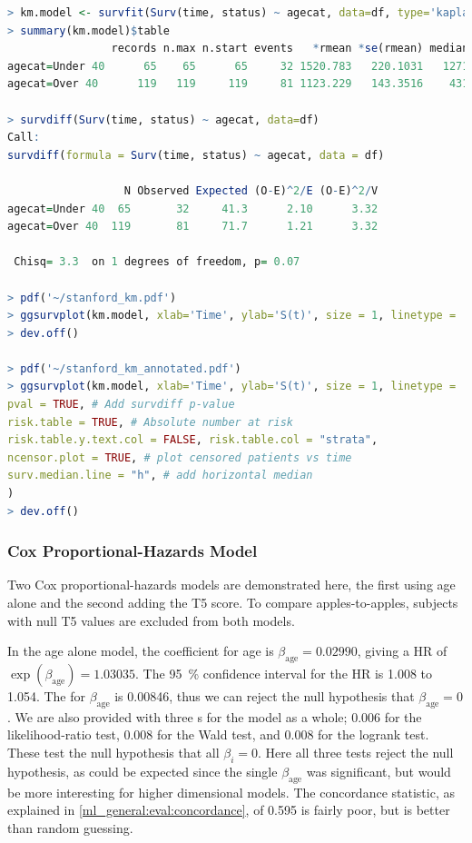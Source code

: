 \begin{lstlisting}[language=R]
> km.model <- survfit(Surv(time, status) ~ agecat, data=df, type='kaplan-meier')
> summary(km.model)$table
                records n.max n.start events   *rmean *se(rmean) median 0.95LCL 0.95UCL
agecat=Under 40      65    65      65     32 1520.783   220.1031   1271     731      NA
agecat=Over 40      119   119     119     81 1123.229   143.3516    431     202     897

> survdiff(Surv(time, status) ~ agecat, data=df)
Call:
survdiff(formula = Surv(time, status) ~ agecat, data = df)

                  N Observed Expected (O-E)^2/E (O-E)^2/V
agecat=Under 40  65       32     41.3      2.10      3.32
agecat=Over 40  119       81     71.7      1.21      3.32

 Chisq= 3.3  on 1 degrees of freedom, p= 0.07

> pdf('~/stanford_km.pdf')
> ggsurvplot(km.model, xlab='Time', ylab='S(t)', size = 1, linetype = 'strata', palette=c('#4e79a7', '#f28e2b'), conf.int = TRUE, legend = c(0.85, 0.85), legend.y = 1, legend.title = '', legend.labs = c('Under 40', 'Over 40'))
> dev.off()

> pdf('~/stanford_km_annotated.pdf')
> ggsurvplot(km.model, xlab='Time', ylab='S(t)', size = 1, linetype = 'strata', palette=c('#4e79a7', '#f28e2b'), conf.int = TRUE, legend = c(0.85, 0.85), legend.y = 1, legend.title = '', legend.labs = c('Under 40', 'Over 40'),
pval = TRUE, # Add survdiff p-value
risk.table = TRUE, # Absolute number at risk
risk.table.y.text.col = FALSE, risk.table.col = "strata",
ncensor.plot = TRUE, # plot censored patients vs time
surv.median.line = "h", # add horizontal median
)
> dev.off()
\end{lstlisting}

\subsubsection{Cox Proportional-Hazards Model}
\label{survival:Rcode:cox}

Two Cox proportional-hazards models are demonstrated here,
the first using age alone and the second adding the T5 score.
To compare apples-to-apples, subjects with null T5 values are excluded from both models.

In the age alone model, the coefficient for age is
$\beta_{\text{age}} = \num{0.02990}$, giving a HR of
$\exp\left(\beta_{\text{age}}\right) = \num{1.03035}$.
The \SI{95}{\percent} confidence interval for the HR is {1.008} to \num{1.054}.
The \pvalue for $\beta_{\text{age}}$ is \num{0.00846},
thus we can reject the null hypothesis that $\beta_{\text{age}} = 0$.
We are also provided with three {\pvalue}s for the model as a whole;
\num{0.006} for the likelihood-ratio test,
\num{0.008} for the Wald test,
and \num{0.008} for the logrank test.
These test the null hypothesis that all $\beta_{i} = 0$.
Here all three tests reject the null hypothesis,
as could be expected since the single $\beta_{\text{age}}$ was significant,
but would be more interesting for higher dimensional models.
The concordance statistic, as explained in \cref{ml_general:eval:concordance},
of \num{0.595} is fairly poor, but is better than random guessing.

